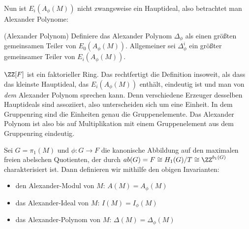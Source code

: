     	Nun ist $E_i(A_\phi(M))$ nicht zwangsweise ein Hauptideal, also betrachtet man Alexander Polynome:
    	\begin{defn}(Alexander Polynom)
    		Definiere das Alexander Polynom $\Delta_\phi$ als einen größten gemeinsamen Teiler von $E_0(A_\phi(M))$. Allgemeiner sei $\Delta_\phi^i$ ein größter gemeinsamer Teiler von $E_i(A_\phi(M))$.
    	\end{defn}
    	\begin{bem}
            $\ZZ[F]$ ist ein faktorieller Ring. Das rechtfertigt die Definition insoweit, als dass das kleinste Hauptideal, das $E_i(A_\phi(M))$ enthält, eindeutig ist und man von \emph{dem} Alexander Polynom sprechen kann. Denn verschiedene Erzeuger desselben Hauptideals sind assoziiert, also unterscheiden sich um eine Einheit. In dem Gruppenring sind die Einheiten genau die Gruppenelemente. Das Alexander Polynom ist also bis auf Multiplikation mit einem Gruppenelement aus dem Gruppenring eindeutig.
    	\end{bem}

        \begin{defn}
            Sei $G=\pi_1(M)$ und $\phi:G \to F$ die kanonische Abbildung auf den maximalen freien abelschen Quotienten, der durch $ab(G) = F \cong H_1(G)/T \cong \ZZ^{b_1(G)}$ charakterisiert ist. Dann definieren wir mithilfe den obigen Invarianten:
            \begin{itemize}
                \item den Alexander-Modul von $M$: $A(M)=A_\phi(M)$
                \item das Alexander-Ideal von $M$: $I(M)=I_\phi(M)$
                \item das Alexander-Polynom von $M$: $\Delta(M)=\Delta_\phi(M)$ 
            \end{itemize}
        \end{defn}

